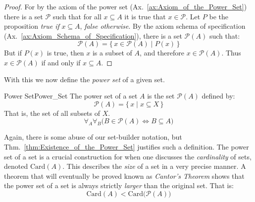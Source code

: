         \begin{proof}
            For by the axiom of the power set
            (Ax.~\ref{ax:Axiom_of_the_Power_Set}) there is a set $\mathscr{P}$
            such that for all $x\subseteq{A}$ it is true that $x\in\mathscr{P}$.
            Let $P$ be the proposition \textit{true if} $x\subseteq{A}$,
            \textit{false otherwise}. By the axiom schema of specification
            (Ax.~\ref{ax:Axiom_Schema_of_Specification}), there is a set
            $\mathcal{P}(A)$ such that:
            \begin{equation}
                \mathcal{P}(A)=\{\,x\in\mathscr{P}(A)\;|\;P(x)\,\}
            \end{equation}
            But if $P(x)$ is true, then $x$ is a subset of $A$, and therefore
            $x\in\mathscr{P}(A)$. Thus $x\in\mathcal{P}(A)$ if and only if
            $x\subseteq{A}$.
        \end{proof}
        With this we now define the \textit{power set} of a given set.
        \newpage
        \begin{fdefinition}{Power Set}{Power_Set}
            The \gls{power set} of a \gls{set} $A$ is the set $\mathcal{P}(A)$
            defined by:
            \begin{equation*}
                \mathcal{P}(A)=\{\,x\;|\;x\subseteq{X}\,\}
            \end{equation*}
            That is, the set of all subsets of $X$.
            \begin{equation*}
                \forall_{A}\forall_{B}\Big(B\in\mathcal{P}(A)\Longleftrightarrow
                    B\subseteq{A}\Big)
            \end{equation*}
        \end{fdefinition}
        Again, there is some abuse of our set-builder notation, but
        Thm.~\ref{thm:Existence_of_the_Power_Set} justifies such a definition.
        The power set of a set is a crucial construction for when one discusses
        the \textit{cardinality} of sets, denoted $\textrm{Card}(A)$. This
        describes the \textit{size} of a set in a very precise manner. A theorem
        that will eventually be proved known as
        \textit{Cantor's Theorem}
        shows that the power set of a set is always strictly \textit{larger}
        than the original set. That is:
        \begin{equation}
            \textrm{Card}(A)<\textrm{Card}\big(\mathcal{P}(A)\big)
        \end{equation}
